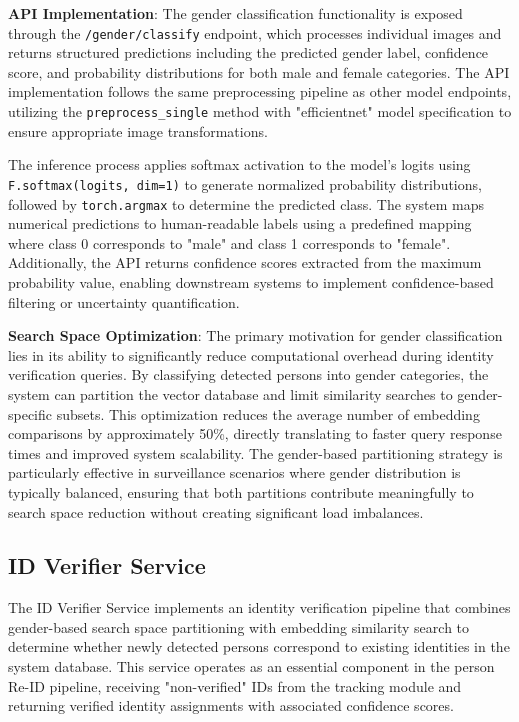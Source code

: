 \textbf{API Implementation}: The gender classification functionality is exposed through the \texttt{/gender/classify} endpoint, which processes individual images and returns structured predictions including the predicted gender label, confidence score, and probability distributions for both male and female categories. The API implementation follows the same preprocessing pipeline as other model endpoints, utilizing the \texttt{preprocess\_single} method with "efficientnet" model specification to ensure appropriate image transformations.

The inference process applies softmax activation to the model's logits using \texttt{F.softmax(logits, dim=1)} to generate normalized probability distributions, followed by \texttt{torch.argmax} to determine the predicted class. The system maps numerical predictions to human-readable labels using a predefined mapping where class 0 corresponds to "male" and class 1 corresponds to "female". Additionally, the API returns confidence scores extracted from the maximum probability value, enabling downstream systems to implement confidence-based filtering or uncertainty quantification.

\textbf{Search Space Optimization}: The primary motivation for gender classification lies in its ability to significantly reduce computational overhead during identity verification queries. By classifying detected persons into gender categories, the system can partition the vector database and limit similarity searches to gender-specific subsets. This optimization reduces the average number of embedding comparisons by approximately 50\%, directly translating to faster query response times and improved system scalability. The gender-based partitioning strategy is particularly effective in surveillance scenarios where gender distribution is typically balanced, ensuring that both partitions contribute meaningfully to search space reduction without creating significant load imbalances.

\subsection{ID Verifier Service}
\label{sec:id_verifier_service}
The ID Verifier Service implements an identity verification pipeline that combines gender-based search space partitioning with embedding similarity search to determine whether newly detected persons correspond to existing identities in the system database. This service operates as an essential component in the person Re-ID pipeline, receiving "non-verified" IDs from the tracking module and returning verified identity assignments with associated confidence scores.

